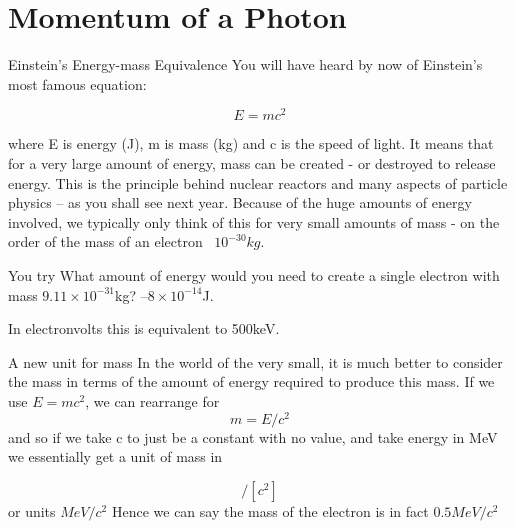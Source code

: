 \documentclass[../Main.tex]{subfiles}
\begin{document}
\author{Momentum of a Photon} %
\date{NOT ASSESSED} %

\section{Momentum of a Photon} %

\begin{frame}{Einstein's Energy-mass Equivalence}
    You will have heard by now of Einstein's most famous equation:

    \begin{equation*}
        E=mc^2
    \end{equation*} 

    where E is energy (J), m is mass (kg) and c is the speed of light.
\newline \newline
It means that for a very large amount of energy, mass can be created - or destroyed to release energy. This is the principle behind nuclear reactors and many aspects of particle physics -- as you shall see next year.
\newline \newline
Because of the huge amounts of energy involved, we typically only think of this for very small amounts of mass - on the order of the mass of an electron ~$10^{-30}kg$. %

\begin{exampleblock}{You try}
What amount of energy would you need to create a single electron with mass $9.11\times 10^{-31}$kg? %
--$8\times 10^{-14}$J.
\end{exampleblock}
In electronvolts this is equivalent to 500keV.
\end{frame}

\begin{frame}{A new unit for mass}
    In the world of the very small, it is much better to consider the mass in terms of the amount of energy required to produce this mass. 
\newline \newline
If we use $E=mc^2$, we can rearrange for
\begin{equation*}
    m=E/c^2
\end{equation*} and so if we take c to just be a constant with no value, and take energy in MeV we essentially get a unit of mass in 

\begin{equation*}
    [MeV]/[c^2]
\end{equation*} or units $MeV/c^2$ %
\newline \newline
Hence we can say the mass of the electron is in fact $0.5MeV/c^2$
\end{frame}
\end{document}
